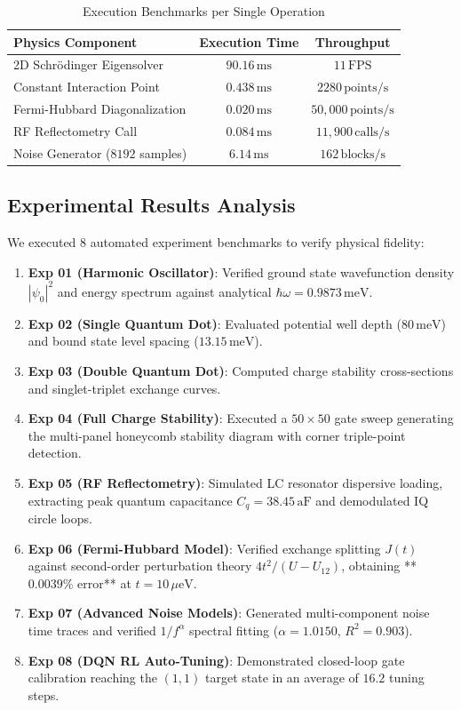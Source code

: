 \documentclass[journal,twocolumn,10pt]{IEEEtran}
\begin{document}
\begin{table}[!h]
\caption{Execution Benchmarks per Single Operation}
\label{table_benchmark}
\centering
\begin{tabular}{l c c}
\toprule
\textbf{Physics Component} & \textbf{Execution Time} & \textbf{Throughput} \\
\midrule
2D Schrödinger Eigensolver & $90.16\,\text{ms}$ & $11\,\text{FPS}$ \\
Constant Interaction Point & $0.438\,\text{ms}$ & $2280\,\text{points/s}$ \\
Fermi-Hubbard Diagonalization & $0.020\,\text{ms}$ & $50,000\,\text{points/s}$ \\
RF Reflectometry Call & $0.084\,\text{ms}$ & $11,900\,\text{calls/s}$ \\
Noise Generator ($8192$ samples) & $6.14\,\text{ms}$ & $162\,\text{blocks/s}$ \\
\bottomrule
\end{tabular}
\end{table}

\subsection{Experimental Results Analysis}
We executed 8 automated experiment benchmarks to verify physical fidelity:
\begin{enumerate}
    \item \textbf{Exp 01 (Harmonic Oscillator)}: Verified ground state wavefunction density $|\psi_0|^2$ and energy spectrum against analytical $\hbar\omega = 0.9873\,\text{meV}$.
    \item \textbf{Exp 02 (Single Quantum Dot)}: Evaluated potential well depth ($80\,\text{meV}$) and bound state level spacing ($13.15\,\text{meV}$).
    \item \textbf{Exp 03 (Double Quantum Dot)}: Computed charge stability cross-sections and singlet-triplet exchange curves.
    \item \textbf{Exp 04 (Full Charge Stability)}: Executed a $50 \times 50$ gate sweep generating the multi-panel honeycomb stability diagram with corner triple-point detection.
    \item \textbf{Exp 05 (RF Reflectometry)}: Simulated LC resonator dispersive loading, extracting peak quantum capacitance $C_q = 38.45\,\text{aF}$ and demodulated IQ circle loops.
    \item \textbf{Exp 06 (Fermi-Hubbard Model)}: Verified exchange splitting $J(t)$ against second-order perturbation theory $4t^2/(U-U_{12})$, obtaining **$0.0039\%$ error** at $t=10\,\mu\text{eV}$.
    \item \textbf{Exp 07 (Advanced Noise Models)}: Generated multi-component noise time traces and verified $1/f^\alpha$ spectral fitting ($\alpha = 1.0150$, $R^2 = 0.903$).
    \item \textbf{Exp 08 (DQN RL Auto-Tuning)}: Demonstrated closed-loop gate calibration reaching the $(1,1)$ target state in an average of $16.2$ tuning steps.
\end{enumerate}
\end{document}
